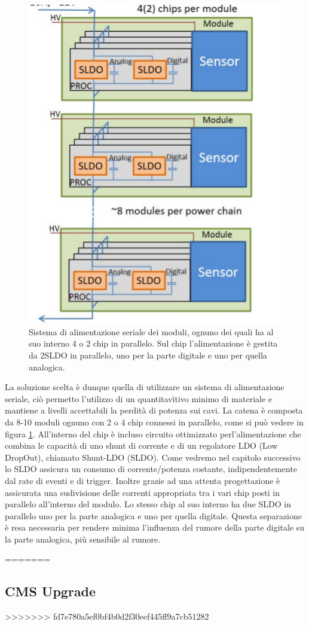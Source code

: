 \begin{figure}
\centering
\includegraphics[scale=0.4]{Immagini/serial}
\caption{Sistema di alimentazione seriale dei moduli, ognuno dei quali ha al suo interno 4 o 2 chip in parallelo. Sul chip l'alimentazione è gestita da 2SLDO in parallelo, uno per la parte digitale e uno per quella analogica.}
\label{serial}
\end{figure}

La soluzione scelta è dunque quella di utilizzare un sistema di alimentazione seriale, ciò permetto l'utilizzo di un quantitavìtivo minimo di materiale e mantiene a livelli accettabili la perdità di potenza sui cavi. 
La catena è composta da 8-10 moduli ognuno con 2 o 4 chip connessi in parallelo, come si può vedere in figura \ref{serial}. 
All'interno del chip è incluso circuito ottimizzato perl'alimentazione che combina le capacità di uno shunt di corrente e di un regolatore LDO (Low DropOut), chiamato Shunt-LDO (SLDO). 
Come vedremo nel capitolo successivo lo SLDO assicura un consumo di corrente/potenza costante, indipendentemente dal rate di eventi e di trigger. 
Inoltre grazie ad una attenta progettazione è assicurata una sudivisione delle correnti appropriata tra i vari chip posti in parallelo all'interno del modulo. Lo stesso chip al suo interno ha due SLDO in parallelo uno per la parte analogica e uno per quella digitale. 
Questa separazione è resa necessaria per rendere minima l'influenza del rumore della parte digitale su la parte analogica, più sensibile  al rumore.



=======
\subsection{CMS Upgrade}
>>>>>>> fd7e780a5ef0bf4b0d2f30eef445ff9a7cb51282
